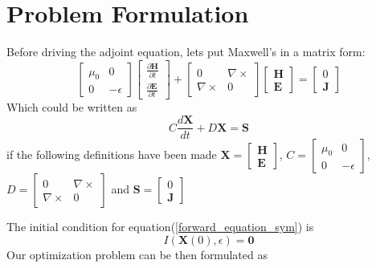 \documentclass{tufte-handout}
\begin{document}
 \section{Problem Formulation}
 Before driving the adjoint equation, lets put Maxwell's in a matrix form:
 \begin{equation}
 \begin{bmatrix} 
 \mu_0 & 0 \\
 0 & -\epsilon
 \end{bmatrix}  \begin{bmatrix} 
 \frac{\partial \mathbf{H}}{\partial t}  \\
  \frac{\partial \mathbf{E}}{\partial t}
 \end{bmatrix} +\begin{bmatrix} 
 0 & \nabla \times \\
 \nabla \times & 0 
 \end{bmatrix}  \begin{bmatrix} 
 \mathbf{H}  \\
 \mathbf{E} 
 \end{bmatrix} = \begin{bmatrix} 
 0 \\
 \mathbf{J} 
 \end{bmatrix}
 \end{equation}
 Which could be written as
 \begin{equation}\label{forward_equation_sym}
C \frac{d \mathbf{X}}{dt} + D \mathbf{X} = \mathbf{S}
 \end{equation} 
 if the following definitions have been made $\mathbf{X} = \begin{bmatrix} 
 \mathbf{H}  \\
 \mathbf{E} 
 \end{bmatrix} $, $C = \begin{bmatrix} 
 \mu_0 & 0 \\
 0 & -\epsilon
 \end{bmatrix}$, $D = \begin{bmatrix} 
 0 & \nabla \times \\
 \nabla \times & 0 
 \end{bmatrix}  $ and $\mathbf{S} = \begin{bmatrix} 
 0 \\
 \mathbf{J} 
 \end{bmatrix} $
 
 The initial condition for equation(\ref{forward_equation_sym}) is \begin{equation}
I(\mathbf{X}(0),\epsilon) = \mathbf{0}
 \end{equation}
 Our optimization problem can  be then formulated as
  
\end{document}

